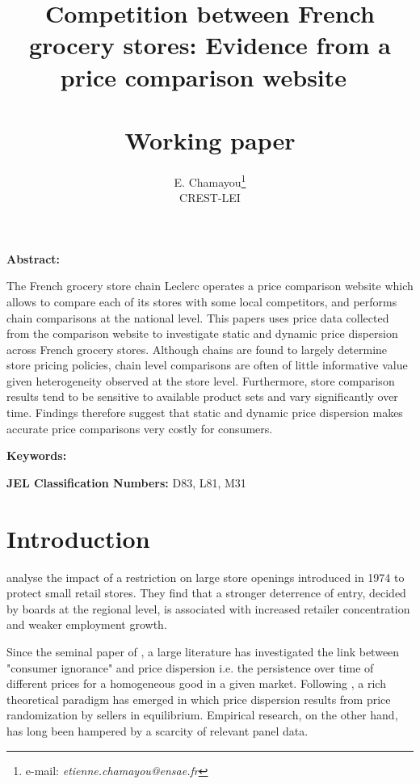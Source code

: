 \documentclass[english]{article}
\begin{document}
\title{Competition between French grocery stores: Evidence from a price comparison website\ \\ \ \\Working paper}
\author{E. Chamayou\thanks{e-mail:
\textit{etienne.chamayou@ensae.fr}} \\ CREST-LEI}
\maketitle

\sloppy%

\onehalfspacing

\textbf{Abstract:}

The French grocery store chain Leclerc operates a price comparison website which allows to compare each of its stores with some local competitors, and performs chain comparisons at the national level. This papers uses price data collected from the comparison website to investigate static and dynamic price dispersion across French grocery stores. Although chains are found to largely determine store pricing policies, chain level comparisons are often of little informative value given heterogeneity observed at the store level. Furthermore, store comparison results tend to be sensitive to available product sets and vary significantly over time. Findings therefore suggest that static and dynamic price dispersion makes accurate price comparisons very costly for consumers.

\strut

\textbf{Keywords:}

\strut

\textbf{JEL Classification Numbers:} D83, L81, M31

\pagebreak%
\begin{flushleft}

\end{flushleft}
\section{Introduction}

\cite{BER02} analyse the impact of a restriction on large store openings introduced in 1974 to protect small retail stores. They find that a stronger deterrence of entry, decided by boards at the regional level, is associated with increased retailer concentration and weaker employment growth.

Since the seminal paper of \cite{STI61}, a large literature has investigated the link between "consumer ignorance" and price dispersion i.e. the persistence over time of different prices for a homogeneous good in a given market. Following \cite{VAR80}, a rich theoretical paradigm has emerged in which price dispersion results from price randomization by sellers in equilibrium. Empirical research, on the other hand, has long been hampered by a scarcity of relevant panel data. 
\end{document}
